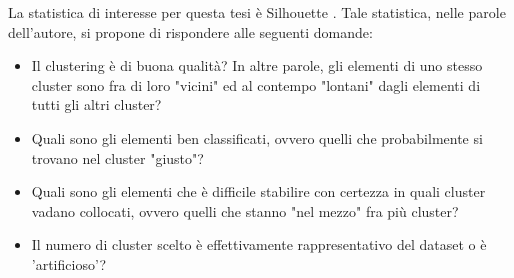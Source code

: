 \documentclass[a4paper, 12pt]{report}
\begin{document}
		La statistica di interesse per questa tesi è Silhouette
		\cite{ROUSSEEUW198753}. Tale statistica, nelle parole
		dell'autore, si propone di rispondere alle seguenti domande:

		\begin{itemize}
			\item
			Il clustering è di buona qualità? In altre parole, gli elementi di
			uno stesso cluster sono fra di loro "vicini" ed al contempo "lontani"
			dagli elementi di tutti gli altri cluster?
			\item
			Quali sono gli elementi ben classificati, ovvero quelli che probabilmente
			si trovano nel cluster "giusto"?
			\item
			Quali sono gli elementi che è difficile stabilire con certezza in quali
			cluster vadano collocati, ovvero quelli che stanno "nel mezzo" fra più
			cluster?
			\item
			Il numero di cluster scelto è effettivamente rappresentativo del dataset
			o è 'artificioso'?
		\end{itemize}
\end{document}
